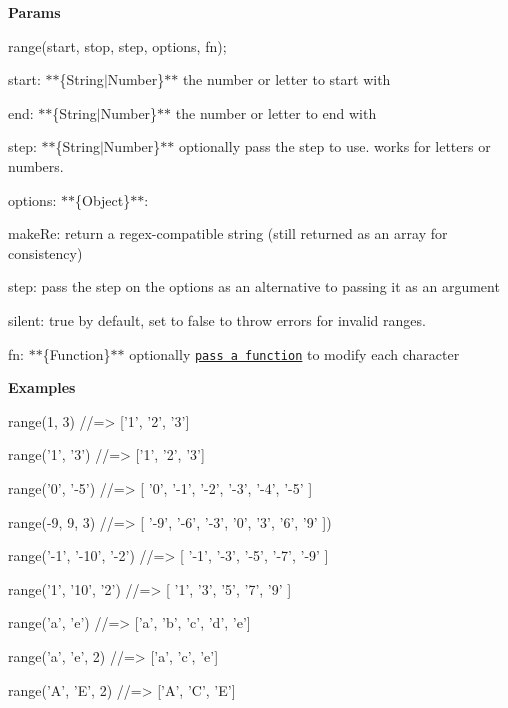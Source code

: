 {\bfseries Params}


\begin{DoxyCode}
range(start, stop, step, options, fn);
\end{DoxyCode}



\begin{DoxyItemize}
\item {\ttfamily start}\+: $\ast$$\ast$\{String$\vert$\+Number\}$\ast$$\ast$ the number or letter to start with
\item {\ttfamily end}\+: $\ast$$\ast$\{String$\vert$\+Number\}$\ast$$\ast$ the number or letter to end with
\item {\ttfamily step}\+: $\ast$$\ast$\{String$\vert$\+Number\}$\ast$$\ast$ optionally pass the step to use. works for letters or numbers.
\item {\ttfamily options}\+: $\ast$$\ast$\{Object\}$\ast$$\ast$\+:
\begin{DoxyItemize}
\item {\ttfamily make\+Re}\+: return a regex-\/compatible string (still returned as an array for consistency)
\item {\ttfamily step}\+: pass the step on the options as an alternative to passing it as an argument
\item {\ttfamily silent}\+: {\ttfamily true} by default, set to false to throw errors for invalid ranges.
\end{DoxyItemize}
\item {\ttfamily fn}\+: $\ast$$\ast$\{Function\}$\ast$$\ast$ optionally \href{#custom-function}{\tt pass a function} to modify each character
\end{DoxyItemize}

{\bfseries Examples}


\begin{DoxyCode}
range(1, 3)
//=> ['1', '2', '3']

range('1', '3')
//=> ['1', '2', '3']

range('0', '-5')
//=> [ '0', '-1', '-2', '-3', '-4', '-5' ]

range(-9, 9, 3)
//=> [ '-9', '-6', '-3', '0', '3', '6', '9' ])

range('-1', '-10', '-2')
//=> [ '-1', '-3', '-5', '-7', '-9' ]

range('1', '10', '2')
//=> [ '1', '3', '5', '7', '9' ]

range('a', 'e')
//=> ['a', 'b', 'c', 'd', 'e']

range('a', 'e', 2)
//=> ['a', 'c', 'e']

range('A', 'E', 2)
//=> ['A', 'C', 'E']
\end{DoxyCode}


